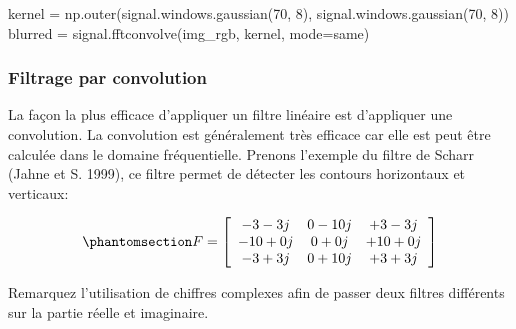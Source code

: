 \documentclass[
  11pt,
  letterpaper,
  open=any,
  twoside=false,
  french]{scrbook}
\newenvironment{Shaded}{\begin{snugshade}}{\end{snugshade}}
\newcommand{\DecValTok}[1]{\textcolor[rgb]{0.68,0.00,0.00}{#1}}
\newcommand{\NormalTok}[1]{\textcolor[rgb]{0.00,0.23,0.31}{#1}}
\newcommand{\OperatorTok}[1]{\textcolor[rgb]{0.37,0.37,0.37}{#1}}
\newcommand{\StringTok}[1]{\textcolor[rgb]{0.13,0.47,0.30}{#1}}
\begin{document}
\begin{Shaded}
\begin{Highlighting}[]
\NormalTok{kernel }\OperatorTok{=}\NormalTok{ np.outer(signal.windows.gaussian(}\DecValTok{70}\NormalTok{, }\DecValTok{8}\NormalTok{),}
\NormalTok{                  signal.windows.gaussian(}\DecValTok{70}\NormalTok{, }\DecValTok{8}\NormalTok{))}
\NormalTok{blurred }\OperatorTok{=}\NormalTok{ signal.fftconvolve(img\_rgb, kernel, mode}\OperatorTok{=}\StringTok{\textquotesingle{}same\textquotesingle{}}\NormalTok{)}
\end{Highlighting}
\end{Shaded}

\subsubsection{Filtrage par convolution}\label{filtrage-par-convolution}

La façon la plus efficace d'appliquer un filtre linéaire est d'appliquer
une convolution. La convolution est généralement très efficace car elle
est peut être calculée dans le domaine fréquentielle. Prenons l'exemple
du filtre de Scharr (Jahne et S. 1999), ce filtre permet de détecter les
contours horizontaux et verticaux:

\begin{equation}\phantomsection\label{eq-scharr-filter}{
F= \left[
\begin{array}{ccc}
-3-3j & 0-10j & +3-3j \\
-10+0j & 0+0j & +10+0j \\
-3+3j & 0+10j & +3+3j
\end{array}
\right]
}\end{equation}

Remarquez l'utilisation de chiffres complexes afin de passer deux
filtres différents sur la partie réelle et imaginaire.
\end{document}
